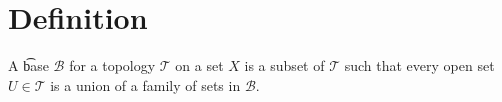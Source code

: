 

\section*{Definition}

A \t{base} $\mathcal{B} $ for a topology $\mathcal{T} $ on a set $X$ is a subset of $\mathcal{T} $ such that every open set $U \in \mathcal{T} $ is a union of a family of sets in $\mathcal{B} $.

\blankpage